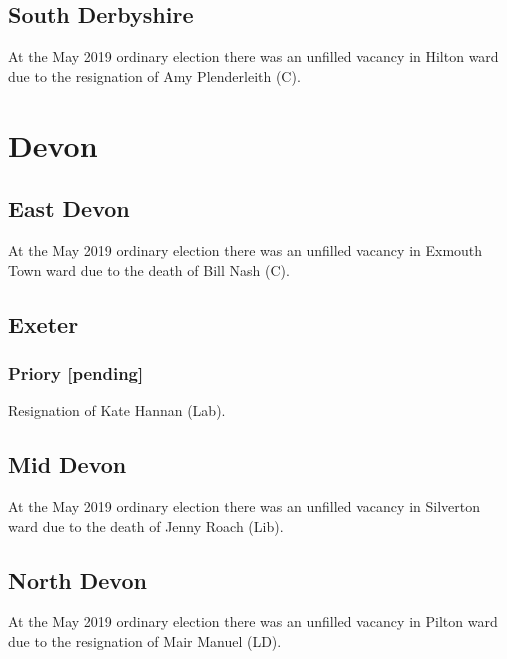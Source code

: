 \documentclass[a4paper,openany]{book}
\begin{document}
\begin{resultsiii}
\subsection*{South Derbyshire}

At the May 2019 ordinary election there was an unfilled vacancy in Hilton ward due to the resignation of Amy Plenderleith (C).

\section{Devon}

\subsection*{East Devon}

At the May 2019 ordinary election there was an unfilled vacancy in Exmouth Town ward due to the death of Bill Nash (C).

\subsection*{Exeter}

\subsubsection*{Priory \hspace*{\fill}\nolinebreak[1]%
	\enspace\hspace*{\fill}
	[pending]}


Resignation of Kate Hannan (Lab).

\subsection*{Mid Devon}

At the May 2019 ordinary election there was an unfilled vacancy in Silverton ward due to the death of Jenny Roach (Lib).

\subsection*{North Devon}

At the May 2019 ordinary election there was an unfilled vacancy in Pilton ward due to the resignation of Mair Manuel (LD).


\end{resultsiii}
\end{document}
